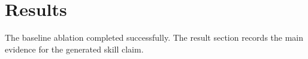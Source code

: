 \section{Results}
The baseline ablation completed successfully. The result section records the main evidence for the generated skill claim.

